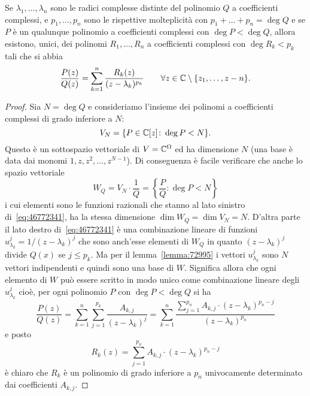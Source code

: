 \begin{theorem}
\label{th:fratti_semplici_complessi}%
%
%
%
Se $\lambda_1, \dots, \lambda_n$ sono le radici complesse
distinte del polinomio $Q$ a coefficienti complessi,
e $p_1,\dots, p_n$ sono le rispettive molteplicità
con $p_1 + \dots + p_n = \deg Q$
e se $P$ è un qualunque polinomio a coefficienti complessi
con $\deg P < \deg Q$,
allora esistono, unici, dei polinomi $R_1, \dots, R_n$
a coefficienti complessi con $\deg R_k < p_k$ tali che
si abbia
\begin{equation}\label{eq:46772341}
  \frac{P(z)}{Q(z)}
  = \sum_{k=1}^n \frac{R_k(z)}{(z-\lambda_k)^{p_k}}
  \qquad \forall z \in \mathbb C\setminus{\left\{ z_1,\dots,z-n \right\}}.
\end{equation}
\end{theorem}
%
\begin{proof}
Sia $N=\deg Q$ e consideriamo
l'insieme dei polinomi a coefficienti complessi
di grado inferiore a $N$:
\[
  V_N = \{P\in \mathbb C[z]\colon \deg P < N\}.
\]
Questo è un sottospazio vettoriale di
$V=\mathbb C^\Omega$ ed ha dimensione
$N$ (una base è data dai monomi $1, z, z^2, \dots, z^{N-1}$).
Di conseguenza è facile verificare che anche lo spazio vettoriale
\[
  W_Q = V_N \cdot \frac{1}{Q} = \left\{\frac{P}{Q}\colon \text{$\deg P < N$}\right\}
\]
i cui elementi sono le funzioni razionali che stanno al lato sinistro
di~\eqref{eq:46772341},
ha la stessa dimensione $\dim W_Q = \dim V_N = N$.
D'altra parte il lato destro di~\eqref{eq:46772341}
è una combinazione lineare di funzioni
$u_{\lambda_k}^j = 1/(z-\lambda_k)^j$ che sono
anch'esse elementi di $W_Q$ in quanto $(z-\lambda_k)^j$ divide $Q(x)$
se $j\le p_k$.
Ma per il lemma~\ref{lemma:72995} i vettori $u_{\lambda_k}^j$ sono
$N$ vettori indipendenti e quindi
sono una base di $W$.
Significa allora che ogni elemento di $W$ può
essere scritto in modo unico come combinazione lineare degli
$u_{\lambda_k}^j$ cioè, per ogni
polinomio $P$ con $\deg P < \deg Q$ si ha
\begin{equation}\label{eq:458934}
 \frac{P(z)}{Q(z)}
 = \sum_{k=1}^n \sum_{j=1}^{p_k} \frac{A_{k,j}}{(z-\lambda_k)^j}
 = \sum_{k=1}^n \frac{\displaystyle \sum_{j=1}^{p_n} A_{k,j}\cdot (z-\lambda_k)^{p_n-j}}{(z-\lambda_k)^{p_n}}
\end{equation}
e posto
\[
  R_k(z) = \sum_{j=1}^{p_n} A_{k,j}\cdot(z-\lambda_k)^{p_n-j}
\]
è chiaro che $R_k$ è un polinomio di grado inferiore a $p_n$
univocamente determinato dai coefficienti $A_{k,j}$.
\end{proof}

